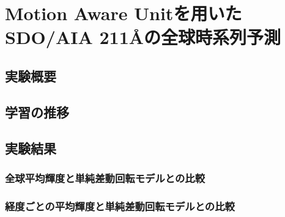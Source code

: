 \chapter{Motion Aware Unitを用いたSDO/AIA 211Åの全球時系列予測}
  \section{実験概要}
  \section{学習の推移}
  \section{実験結果}
    \subsection{全球平均輝度と単純差動回転モデルとの比較}
    \subsection{経度ごとの平均輝度と単純差動回転モデルとの比較}
